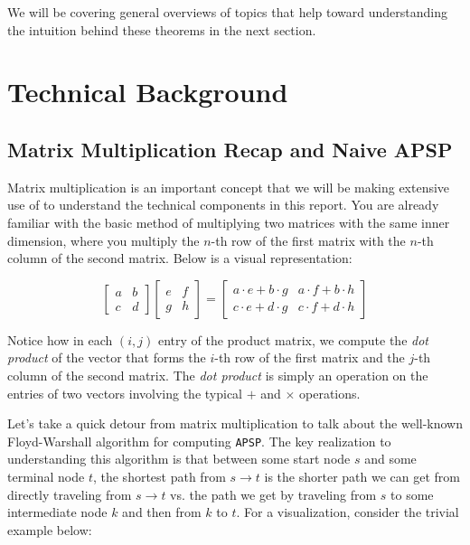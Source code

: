 \documentclass[12pt]{article}
\begin{document}
We will be covering general overviews of topics that help toward understanding the intuition behind these theorems in the next section.

\section{Technical Background} \label{sec:3}

\subsection{Matrix Multiplication Recap and Naive APSP} \label{sec:3.1}

Matrix multiplication is an important concept that we will be making extensive use of to understand the technical components in this report. You are already familiar with the basic method of multiplying two matrices with the same inner dimension, where you multiply the $n$-th row of the first matrix with the $n$-th column of the second matrix. Below is a visual representation:

\[
    \begin{bmatrix}
        a & b \\
        c & d
    \end{bmatrix}
    \begin{bmatrix}
        e & f \\
        g & h
    \end{bmatrix}
    =
    \begin{bmatrix}
        a \cdot e + b \cdot g & a \cdot f + b \cdot h \\
        c \cdot e + d \cdot g & c \cdot f + d \cdot h
    \end{bmatrix}
\]

Notice how in each $(i, j)$ entry of the product matrix, we compute the \emph{dot product} of the vector that forms the $i$-th row of the first matrix and the $j$-th column of the second matrix. The \emph{dot product} is simply an operation on the entries of two vectors involving the typical $+$ and $\times$ operations.

Let's take a quick detour from matrix multiplication to talk about the well-known Floyd-Warshall algorithm for computing \texttt{APSP}. The key realization to understanding this algorithm is that between some start node $s$ and some terminal node $t$, the shortest path from $s \to t$ is the shorter path we can get from directly traveling from $s \to t$ vs. the path we get by traveling from $s$ to some intermediate node $k$ and then from $k$ to $t$. For a visualization, consider the trivial example below:
\end{document}
